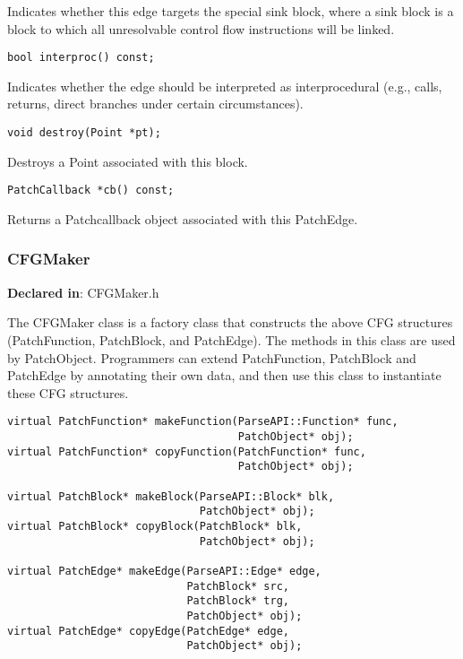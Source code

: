 Indicates whether this edge targets the special sink block, where a sink block
is a block to which all unresolvable control ﬂow instructions will be
linked.


\begin{verbatim}
bool interproc() const;

\end{verbatim}



Indicates whether the edge should be interpreted as interprocedural (e.g.,
calls, returns, direct branches under certain circumstances).


\begin{verbatim}
void destroy(Point *pt);

\end{verbatim}



Destroys a Point associated with this block.


\begin{verbatim}
PatchCallback *cb() const;

\end{verbatim}



Returns a Patchcallback object associated with this PatchEdge.

\subsubsection{CFGMaker}
\label{sec-3.2.12}

\textbf{Declared in}: CFGMaker.h

The CFGMaker class is a factory class that constructs the above CFG structures
(PatchFunction, PatchBlock, and PatchEdge). The methods in this class are used
by PatchObject. Programmers can extend PatchFunction, PatchBlock and PatchEdge
by annotating their own data, and then use this class to instantiate these CFG
structures.


\begin{verbatim}
virtual PatchFunction* makeFunction(ParseAPI::Function* func,
                                    PatchObject* obj);
virtual PatchFunction* copyFunction(PatchFunction* func,
                                    PatchObject* obj);

virtual PatchBlock* makeBlock(ParseAPI::Block* blk,
                              PatchObject* obj);
virtual PatchBlock* copyBlock(PatchBlock* blk,
                              PatchObject* obj);

virtual PatchEdge* makeEdge(ParseAPI::Edge* edge,
                            PatchBlock* src,
                            PatchBlock* trg,
                            PatchObject* obj);
virtual PatchEdge* copyEdge(PatchEdge* edge,
                            PatchObject* obj);

\end{verbatim}



